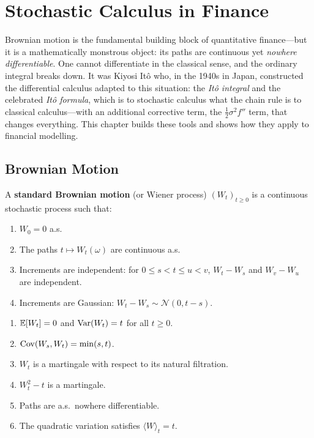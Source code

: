 \chapter{Stochastic Calculus in Finance}
\label{ch:stochastic_calculus}

Brownian motion is the fundamental building block of quantitative finance---but it is a mathematically monstrous object: its paths are continuous yet \emph{nowhere differentiable}. One cannot differentiate in the classical sense, and the ordinary integral breaks down. It was Kiyosi It\^o who, in the 1940s in Japan, constructed the differential calculus adapted to this situation: the \emph{It\^o integral} and the celebrated \emph{It\^o formula}, which is to stochastic calculus what the chain rule is to classical calculus---with an additional corrective term, the $\frac{1}{2}\sigma^2 f''$ term, that changes everything. This chapter builds these tools and shows how they apply to financial modelling.

\section{Brownian Motion}

\begin{definition}
A \textbf{standard Brownian motion} (or Wiener process) $(W_t)_{t \geq 0}$
is a continuous stochastic process such that:
\begin{enumerate}
    \item $W_0 = 0$ a.s.
    \item The paths $t \mapsto W_t(\omega)$ are continuous a.s.
    \item Increments are independent: for $0 \leq s < t \leq u < v$,
          $W_t - W_s$ and $W_v - W_u$ are independent.
    \item Increments are Gaussian: $W_t - W_s \sim \mathcal{N}(0, t-s)$.
\end{enumerate}
\end{definition}

\begin{proposition}
\begin{enumerate}
    \item $\mathbb{E}[W_t] = 0$ and $\mathrm{Var}(W_t) = t$ for all $t \geq 0$.
    \item $\mathrm{Cov}(W_s, W_t) = \min(s,t)$.
    \item $W_t$ is a martingale with respect to its natural filtration.
    \item $W_t^2 - t$ is a martingale.
    \item Paths are a.s.\ nowhere differentiable.
    \item The quadratic variation satisfies $\langle W \rangle_t = t$.
\end{enumerate}
\end{proposition}

